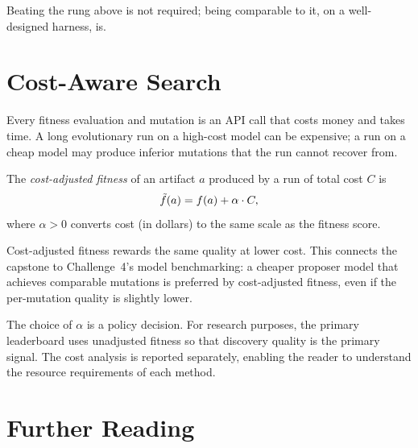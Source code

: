 Beating the rung above is not required; being comparable to it, on a well-designed harness, is.

\section{Cost-Aware Search}
\label{section:CostAwareSearch}

Every fitness evaluation and mutation is an API call that costs money and takes time.
A long evolutionary run on a high-cost model can be expensive; a run on a cheap model may produce inferior mutations that the run cannot recover from.

\begin{definition}
The \emph{cost-adjusted fitness} of an artifact $a$ produced by a run of total cost $C$ is
\begin{equation}
\tilde{f}(a) = f(a) + \alpha \cdot C ,
\label{equation:CostAdjustedFitness}
\end{equation}
where $\alpha > 0$ converts cost (in dollars) to the same scale as the fitness score.
\end{definition}

Cost-adjusted fitness rewards the same quality at lower cost.
This connects the capstone to Challenge~4's model benchmarking: a cheaper proposer model that achieves comparable mutations is preferred by cost-adjusted fitness, even if the per-mutation quality is slightly lower.

\begin{remark}
The choice of $\alpha$ is a policy decision.
For research purposes, the primary leaderboard uses unadjusted fitness so that discovery quality is the primary signal.
The cost analysis is reported separately, enabling the reader to understand the resource requirements of each method.
\end{remark}

\section*{Further Reading}

